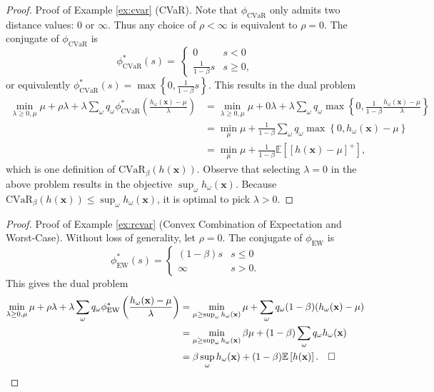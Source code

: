 \documentclass[opre,nonblindrev]{informs3} %
\newcommand{\E}{\mathbb{E}}
\newcommand{\e}[1]{\E \left[ #1 \right]}
\newcommand{\x}{\mathbf{x}}
\begin{document}
\begin{APPENDICES}
\begin{proof}{\sc Proof of Example \ref{ex:cvar} (CVaR).}
%	
	Note that $\phi_{\text{CVaR}}$ only admits two distance values: $0$ or $\infty$.
	Thus any choice of $\rho < \infty$ is equivalent to $\rho = 0$.
	The conjugate of $\phi_{\text{CVaR}}$ is
	\[
	\phi_{\text{CVaR}}^*(s) = \
		\begin{cases}
			0 & s < 0 \\
			\frac{1}{1-\beta} s & s \geq 0,
		\end{cases}
	\]
	or equivalently $\phi_{\text{CVaR}}^*(s) = \max\left\{0, \frac{1}{1-\beta} s \right\}$. 
	This results in the dual problem 
	\begin{align*}
		\min_{\lambda \geq 0,\mu} \mu + \rho \lambda + \lambda \sum_\omega q_\omega \phi_{\text{CVaR}}^*\left( \frac{h_\omega(\x)-\mu}{\lambda} \right) & = \min_{\lambda \geq 0, \mu} \mu + 0\lambda 
		 + \lambda \sum_\omega q_\omega \max\left\{ 0, \frac{1}{1-\beta} \frac{h_\omega(\x)-\mu}{\lambda} \right\} \\
		& = \min_{\mu} \mu + \frac{1}{1-\beta} \sum_\omega q_\omega \max\left\{ 0, h_\omega(\x)-\mu \right\} \\
		& = \min_{\mu} \mu + \frac{1}{1-\beta} \e{[h(\x)-\mu]^+},
	\end{align*}
	which is one definition of $\text{CVaR}_\beta(h(\x))$. 
	Observe that selecting $\lambda=0$ in the above problem results in the objective $\sup_\omega h_\omega(\x)$. 
	Because $\text{CVaR}_\beta(h(\x)) \leq \sup_\omega h_\omega(\x)$, it is optimal to pick $\lambda >0$. 
	\Halmos
\end{proof}


\begin{proof}{\sc Proof of Example \ref{ex:rcvar} (Convex Combination of Expectation and Worst-Case).}
	Without loss of generality, let $\rho = 0$.
	The conjugate of $\phi_{\text{EW}}$ is
	\[
		\phi_{\text{EW}}^*(s) =
		\begin{cases}
			(1-\beta) s & s \leq 0 \\
			\infty & s > 0.
		\end{cases}
	\]
	This gives the dual problem
	\begin{align*}
		\min_{\lambda \geq 0,\mu} \mu + \rho \lambda + \lambda \sum_\omega q_\omega \phi_{\text{EW}}^*\left(\frac{h_\omega(\x)-\mu}{\lambda}\right) & = \min_{\mu \geq \sup_\omega h_\omega(\x)} \mu + \sum_\omega q_\omega (1-\beta) (h_\omega(\x) - \mu) \\
		& = \min_{\mu \geq \sup_\omega h_\omega(\x)} \beta \mu + (1-\beta) \sum_\omega q_\omega h_\omega(\x) \\
		& = \beta \sup_\omega h_\omega(\x) + (1-\beta) \e{h(\x)}. \halmos
	\end{align*}
\end{proof}



\end{APPENDICES}
\end{document}
